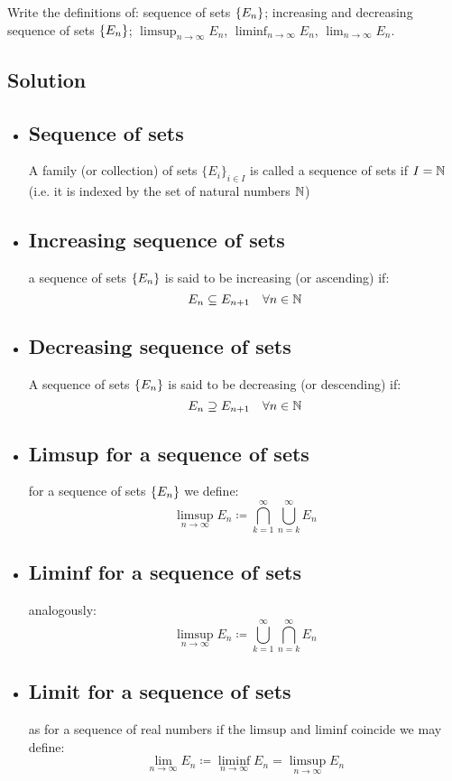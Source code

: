 \sheet


\question
Write the definitions of: sequence of sets $\{ E_n \}$; increasing and decreasing sequence of sets $\{ E_n \}$;
$\limsup_{n\to\infty} E_n$, $\liminf_{n\to\infty} E_n$, $\lim_{n\to\infty} E_n$.

\subsection*{Solution}

\provdefs
\begin{itemize}
    \item \subsection{Sequence of sets} A family (or collection) of sets $\{E_i\}_{i\in I}$ is called a sequence of sets if $I=\mathbb{N}$ (i.e. it is indexed by the set of natural numbers $\mathbb{N}$)
    \item \subsection{Increasing sequence of sets} a sequence of sets $\{ E_n \}$ is said to be increasing (or ascending) if:
    \[
        E_n \subseteq E_{n+1} \quad \forall n\in\mathbb{N}    
    \]
    \item \subsection{Decreasing sequence of sets}
    A sequence of sets $\{ E_n \}$ is said to be decreasing (or descending) if:
    \[
        E_n \supseteq E_{n+1} \quad \forall n\in\mathbb{N}    
    \]
    \item \subsection{Limsup for a sequence of sets} for a sequence of sets $\{ E_n \}$ we define:
    \[
        \limsup_{n\to\infty} E_n \coloneqq \bigcap_{k=1}^{\infty} \bigcup_{n=k}^\infty E_n
    \]
    \item \subsection{Liminf for a sequence of sets} analogously:
    \[
        \limsup_{n\to\infty} E_n \coloneqq \bigcup_{k=1}^{\infty} \bigcap_{n=k}^\infty E_n
    \]
    \item \subsection{Limit for a sequence of sets} as for a sequence of real numbers if the limsup and liminf coincide we may define:
    \[
        \lim_{n\to\infty} E_n \coloneqq \liminf_{n\to\infty} E_n = \limsup_{n\to\infty} E_n    
    \]
\end{itemize}

